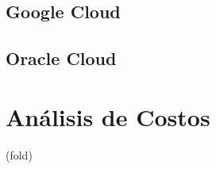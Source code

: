 \subsection{Google Cloud}

\subsection{Oracle Cloud}

\section{Análisis de Costos} %
\label{sec:Análisis de Costos}
 (fold)


















